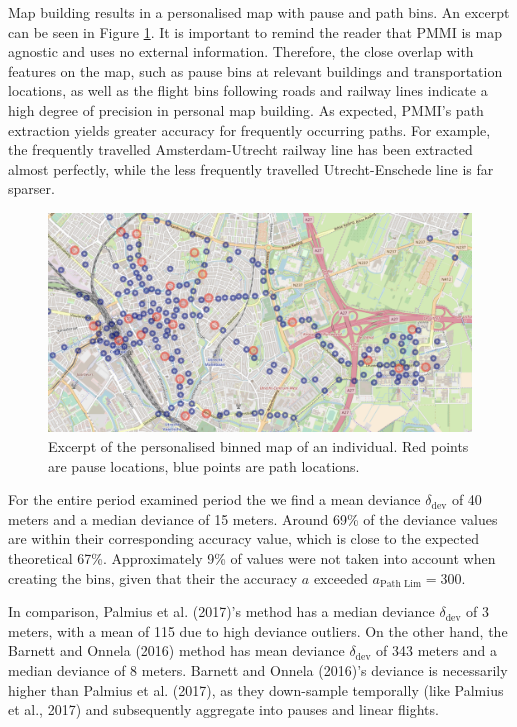 \documentclass[man]{apa6}
\theoremstyle{definition}
\theoremstyle{definition}
\theoremstyle{definition}
\theoremstyle{remark}
\begin{document}
Map building results in a personalised map with pause and path bins. An
excerpt can be seen in Figure \ref{fig:mapClusterMap}. It is important
to remind the reader that PMMI is map agnostic and uses no external
information. Therefore, the close overlap with features on the map, such
as pause bins at relevant buildings and transportation locations, as
well as the flight bins following roads and railway lines indicate a
high degree of precision in personal map building. As expected, PMMI's
path extraction yields greater accuracy for frequently occurring paths.
For example, the frequently travelled Amsterdam-Utrecht railway line has
been extracted almost perfectly, while the less frequently travelled
Utrecht-Enschede line is far sparser.

\begin{figure}
\includegraphics[width=1\linewidth]{img/mapClusterMap} \caption{Excerpt of the personalised binned map of an individual. Red points are pause locations, blue points are path locations.}\label{fig:mapClusterMap}
\end{figure}

For the entire period examined period the we find a mean deviance
\(\delta_{\text{dev}}\) of 40 meters and a median deviance of 15 meters.
Around 69\% of the deviance values are within their corresponding
accuracy value, which is close to the expected theoretical 67\%.
Approximately 9\% of values were not taken into account when creating
the bins, given that their the accuracy \(a\) exceeded
\(a_{\text{Path Lim}} = 300\).

In comparison, Palmius et al. (2017)'s method has a median deviance
\(\delta_{\text{dev}}\) of 3 meters, with a mean of 115 due to high
deviance outliers. On the other hand, the Barnett and Onnela (2016)
method has mean deviance \(\delta_{\text{dev}}\) of 343 meters and a
median deviance of 8 meters. Barnett and Onnela (2016)'s deviance is
necessarily higher than Palmius et al. (2017), as they down-sample
temporally (like Palmius et al., 2017) and subsequently aggregate into
pauses and linear flights.
\end{document}
